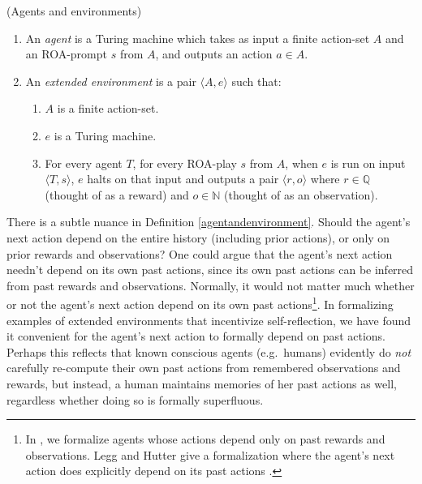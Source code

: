 \documentclass[runningheads]{llncs}
\begin{document}
\begin{definition}
\label{agentandenvironment}
(Agents and environments)
    \begin{enumerate}
    \item An \emph{agent} is a Turing machine which takes as input a finite action-set $A$
    and an ROA-prompt $s$ from $A$, and outputs an action $a\in A$.
    \item An \emph{extended environment} is a pair $\langle A,e\rangle$ such that:
        \begin{enumerate}
            \item $A$ is a finite action-set.
            \item $e$ is a Turing machine.
            \item
            For every agent $T$, for every
            ROA-play $s$ from $A$,
            when $e$ is run on input $\langle T,s\rangle$, $e$ halts on that input
            and outputs a pair $\langle r,o\rangle$ where $r\in\mathbb Q$ (thought of
            as a reward) and $o\in\mathbb N$ (thought of as an observation).
        \end{enumerate}
    \end{enumerate}
\end{definition}

There is a subtle nuance in Definition \ref{agentandenvironment}. Should the agent's
next action depend on the entire history (including prior actions), or only on prior
rewards and observations? One could argue that
the agent's next action needn't depend on its own past actions, since its own past actions
can be inferred from past rewards and observations.
Normally, it would not matter much whether
or not the agent's next action depend on its own past actions\footnote{In
\cite{alexander2019intelligence}, we
formalize agents whose actions depend only on past rewards and observations.
Legg and Hutter give a formalization where the agent's next action does explicitly
depend on its past actions \cite{legg2007universal}.}. In formalizing examples of extended
environments that incentivize self-reflection, we have found it convenient for the agent's
next action to formally depend on past actions. Perhaps this reflects that known
conscious agents (e.g.\ humans)
evidently do \emph{not} carefully re-compute their own
past actions from remembered observations and rewards, but instead, a human maintains
memories of her past actions as well, regardless whether doing so is formally superfluous.
\end{document}
